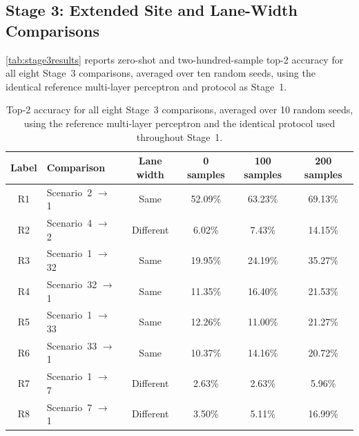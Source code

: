 \documentclass{iutbscthesis}
\begin{document}
\subsection{Stage 3: Extended Site and Lane-Width Comparisons}
\label{sec:stage3results}

\autoref{tab:stage3results} reports zero-shot and two-hundred-sample top-2 accuracy for all eight Stage~3 comparisons, averaged over ten random seeds, using the identical reference multi-layer perceptron and protocol as Stage~1.

\begin{table}[H]
    \centering
    \begin{tabular}{c l c c c c}
        \toprule
        Label & Comparison & Lane width & 0 samples & 100 samples & 200 samples \\
        \midrule
        R1 & Scenario~2 $\to$ 1 & Same & 52.09\% & 63.23\% & 69.13\% \\
        R2 & Scenario~4 $\to$ 2 & Different & 6.02\% & 7.43\% & 14.15\% \\
        R3 & Scenario~1 $\to$ 32 & Same & 19.95\% & 24.19\% & 35.27\% \\
        R4 & Scenario~32 $\to$ 1 & Same & 11.35\% & 16.40\% & 21.53\% \\
        R5 & Scenario~1 $\to$ 33 & Same & 12.26\% & 11.00\% & 21.27\% \\
        R6 & Scenario~33 $\to$ 1 & Same & 10.37\% & 14.16\% & 20.72\% \\
        R7 & Scenario~1 $\to$ 7 & Different & 2.63\% & 2.63\% & 5.96\% \\
        R8 & Scenario~7 $\to$ 1 & Different & 3.50\% & 5.11\% & 16.99\% \\
        \bottomrule
    \end{tabular}
    \caption{Top-2 accuracy for all eight Stage~3 comparisons, averaged over 10 random seeds, using the reference multi-layer perceptron and the identical protocol used throughout Stage~1.}
    \label{tab:stage3results}
\end{table}
\end{document}
